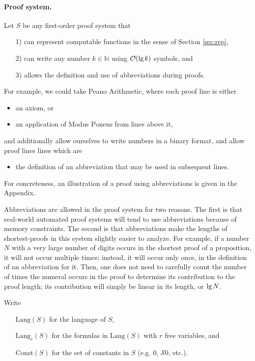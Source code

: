 \documentclass[onecolumn]{miri-tech-article}
\numberwithin{equation}{section}
\theoremstyle{definition}
\newcommand{\NN}{\mathbb{N}}
\newcommand{\Oo}{\mathcal{O}}
\newcommand{\Ss}{\mathcal{S}}
\newcommand{\Lang}{\mathrm{Lang}}
\newcommand{\Const}{\mathrm{Const}}
\renewcommand{\lg}{\mathrm{lg\hspace{0.3ex}}}
\renewcommand{\-}{^{-1}}
\begin{document}
\paragraph{Proof system.}
\label{sec:system}
Let $S$ be any first-order proof system that
\begin{itemize}
\item[1)] can represent computable functions in the sense of Section \ref{sec:rep},
\item[2)] can write any number $k\in\NN$ using $\Oo(\lg k)$ symbols, and 
\item[3)] allows the definition and use of abbreviations during proofs.
\end{itemize}
For example, we could take Peano Arithmetic, where each proof line is either 
\begin{itemize}
\item an axiom, or
\item an application of Modus Ponens from lines above it,
\end{itemize}
and additionally allow ourselves to write numbers in a binary format, and allow proof lines lines which are
\begin{itemize}
\item the definition of an abbreviation that may be used in subsequent lines.
\end{itemize}
For concreteness, an illustration of a proof using abbreviations is given in the Appendix.

Abbreviations are allowed in the proof system for two reasons.  The first is that real-world automated proof systems will tend to use abbreviations because of memory constraints.  The second is that abbreviations make the lengths of shortest-proofs in this system slightly easier to analyze.  For example, if a number $N$ with a very large number of digits occurs in the shortest proof of a proposition, it will not occur multiple times; instead, it will occur only once, in the definition of an abbreviation for it.  Then, one does not need to carefully count the number of times the numeral occurs in the proof to determine its contribution to the proof length; its contribution will simply be linear in its length, or $\lg N$.

Write 
\begin{itemize}
\item[] $\Lang(S)$ for the language of $S$,
\item[] $\Lang_r(S)$ for the formulas in $\Lang(S)$ with $r$ free variables, and 
\item[] $\Const(S)$ for the set of constants in $S$ (e.g. $0$, $\Ss 0$, etc.).
\end{itemize}
\end{document}
